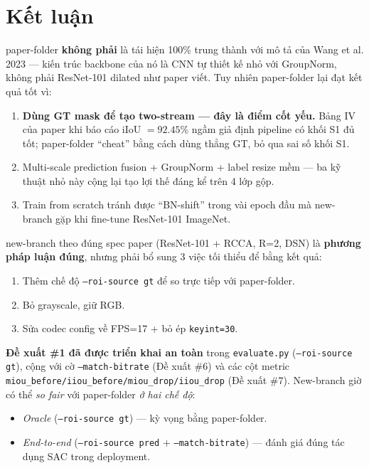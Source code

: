 \documentclass[12pt,a4paper]{article}
\begin{document}
\section{Kết luận}

paper-folder \textbf{không phải} là tái hiện 100\% trung thành với mô tả của Wang et
al. 2023 — kiến trúc backbone của nó là CNN tự thiết kế nhỏ với GroupNorm, không phải
ResNet-101 dilated như paper viết. Tuy nhiên paper-folder lại đạt kết quả tốt vì:
\begin{enumerate}[leftmargin=2em]
  \item \textbf{Dùng GT mask để tạo two-stream — đây là điểm cốt yếu.} Bảng IV của
        paper khi báo cáo iIoU $=92.45\%$ ngầm giả định pipeline có khối S1 đủ tốt;
        paper-folder ``cheat'' bằng cách dùng thẳng GT, bỏ qua sai số khối S1.
  \item Multi-scale prediction fusion + GroupNorm + label resize mềm — ba kỹ thuật
        nhỏ này cộng lại tạo lợi thế đáng kể trên 4 lớp gộp.
  \item Train from scratch tránh được ``BN-shift'' trong vài epoch đầu mà new-branch
        gặp khi fine-tune ResNet-101 ImageNet.
\end{enumerate}

new-branch theo đúng spec paper (ResNet-101 + RCCA, R=2, DSN) là \textbf{phương pháp
luận đúng}, nhưng phải bổ sung 3 việc tối thiểu để bằng kết quả:
\begin{enumerate}[leftmargin=2em]
  \item Thêm chế độ \texttt{--roi-source gt} để so trực tiếp với paper-folder.
  \item Bỏ grayscale, giữ RGB.
  \item Sửa codec config về FPS=17 + bỏ ép \texttt{keyint=30}.
\end{enumerate}

\textbf{Đề xuất \#1 đã được triển khai an toàn} trong \texttt{evaluate.py}
(\texttt{--roi-source gt}), cộng với cờ \texttt{--match-bitrate} (Đề xuất \#6) và
các cột metric \texttt{miou\_before/iiou\_before/miou\_drop/iiou\_drop}
(Đề xuất \#7). New-branch giờ có thể \emph{so fair} với paper-folder \emph{ở hai chế
độ}:
\begin{itemize}[leftmargin=2em]
  \item \emph{Oracle} (\texttt{--roi-source gt}) — kỳ vọng bằng paper-folder.
  \item \emph{End-to-end} (\texttt{--roi-source pred} + \texttt{--match-bitrate})
        — đánh giá đúng tác dụng SAC trong deployment.
\end{itemize}
\end{document}
